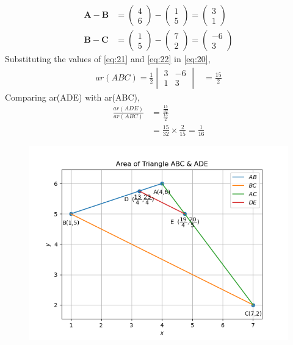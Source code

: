 \documentclass[12pt]{article}
\newcommand{\mydet}[1]{\ensuremath{\begin{vmatrix}#1\end{vmatrix}}}
\providecommand{\brak}[1]{\ensuremath{\left(#1\right)}}
\newcommand{\myvec}[1]{\ensuremath{\begin{pmatrix}#1\end{pmatrix}}}
\let\vec\mathbf
\begin{document}
\begin{enumerate}
\begin{align}
	\vec{A}- \vec{B} &= \myvec{4\\6}-\myvec{1\\5}=\myvec{3\\1}\label{eq:21}\\
	  \vec{B}-\vec{C} &= \myvec{1\\5}-\myvec{7\\2}=\myvec{-6\\3}\label{eq:22}
  \end{align}
Substituting the values of \eqref{eq:21} and \eqref{eq:22} in \eqref{eq:20},
\begin{align}
	ar(ABC)=\frac{1}{2}\mydet{3 & -6\\1 & 3}  
	&=	\frac{15}{2}
\end{align}
		Comparing ar(ADE) with ar(ABC),
\begin{align}
	\frac{ar\brak{ADE}}{ar\brak{ABC}}&=\frac{\frac{15}{32}}{\frac{15}{2}}\\
	&=\frac{15}{32}\times \frac{2}{15}=\frac{1}{16}
\end{align}

\begin{figure}[!h]
 \begin{center}
 \includegraphics[width=\columnwidth]{figs/fig.png}
 \end{center}
\caption{}
\label{fig:Fig1}
\end{figure}
\end{enumerate}
\end{document}
